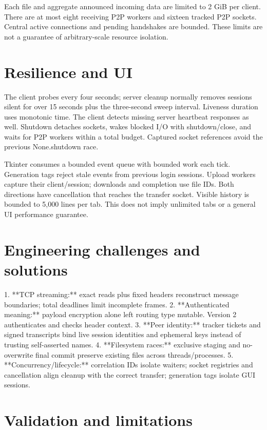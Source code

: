\documentclass[11pt,a4paper]{article}
\begin{document}
Each file and aggregate announced incoming data are limited to 2 GiB per client. There are at most eight receiving P2P workers and sixteen tracked P2P sockets. Central active connections and pending handshakes are bounded. These limits are not a guarantee of arbitrary-scale resource isolation.

\section{Resilience and UI}

The client probes every four seconds; server cleanup normally removes sessions silent for over 15 seconds plus the three-second sweep interval. Liveness duration uses monotonic time. The client detects missing server heartbeat responses as well. Shutdown detaches sockets, wakes blocked I/O with shutdown/close, and waits for P2P workers within a total budget. Captured socket references avoid the previous None.shutdown race.

Tkinter consumes a bounded event queue with bounded work each tick. Generation tags reject stale events from previous login sessions. Upload workers capture their client/session; downloads and completion use file IDs. Both directions have cancellation that reaches the transfer socket. Visible history is bounded to 5,000 lines per tab. This does not imply unlimited tabs or a general UI performance guarantee.

\section{Engineering challenges and solutions}

1. **TCP streaming:** exact reads plus fixed headers reconstruct message boundaries; total deadlines limit incomplete frames.
2. **Authenticated meaning:** payload encryption alone left routing type mutable. Version 2 authenticates and checks header context.
3. **Peer identity:** tracker tickets and signed transcripts bind live session identities and ephemeral keys instead of trusting self-asserted names.
4. **Filesystem races:** exclusive staging and no-overwrite final commit preserve existing files across threads/processes.
5. **Concurrency/lifecycle:** correlation IDs isolate waiters; socket registries and cancellation align cleanup with the correct transfer; generation tags isolate GUI sessions.

\section{Validation and limitations}
\end{document}
